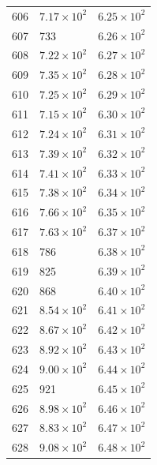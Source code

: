 \begin{table}[H]
\begin{tabular}{lll}
606 & $\displaystyle 7.17 \times 10^{2}$ & $\displaystyle 6.25 \times 10^{2}$ \\
607 & 733 & $\displaystyle 6.26 \times 10^{2}$ \\
608 & $\displaystyle 7.22 \times 10^{2}$ & $\displaystyle 6.27 \times 10^{2}$ \\
609 & $\displaystyle 7.35 \times 10^{2}$ & $\displaystyle 6.28 \times 10^{2}$ \\
610 & $\displaystyle 7.25 \times 10^{2}$ & $\displaystyle 6.29 \times 10^{2}$ \\
611 & $\displaystyle 7.15 \times 10^{2}$ & $\displaystyle 6.30 \times 10^{2}$ \\
612 & $\displaystyle 7.24 \times 10^{2}$ & $\displaystyle 6.31 \times 10^{2}$ \\
613 & $\displaystyle 7.39 \times 10^{2}$ & $\displaystyle 6.32 \times 10^{2}$ \\
614 & $\displaystyle 7.41 \times 10^{2}$ & $\displaystyle 6.33 \times 10^{2}$ \\
615 & $\displaystyle 7.38 \times 10^{2}$ & $\displaystyle 6.34 \times 10^{2}$ \\
616 & $\displaystyle 7.66 \times 10^{2}$ & $\displaystyle 6.35 \times 10^{2}$ \\
617 & $\displaystyle 7.63 \times 10^{2}$ & $\displaystyle 6.37 \times 10^{2}$ \\
618 & 786 & $\displaystyle 6.38 \times 10^{2}$ \\
619 & 825 & $\displaystyle 6.39 \times 10^{2}$ \\
620 & 868 & $\displaystyle 6.40 \times 10^{2}$ \\
621 & $\displaystyle 8.54 \times 10^{2}$ & $\displaystyle 6.41 \times 10^{2}$ \\
622 & $\displaystyle 8.67 \times 10^{2}$ & $\displaystyle 6.42 \times 10^{2}$ \\
623 & $\displaystyle 8.92 \times 10^{2}$ & $\displaystyle 6.43 \times 10^{2}$ \\
624 & $\displaystyle 9.00 \times 10^{2}$ & $\displaystyle 6.44 \times 10^{2}$ \\
625 & 921 & $\displaystyle 6.45 \times 10^{2}$ \\
626 & $\displaystyle 8.98 \times 10^{2}$ & $\displaystyle 6.46 \times 10^{2}$ \\
627 & $\displaystyle 8.83 \times 10^{2}$ & $\displaystyle 6.47 \times 10^{2}$ \\
628 & $\displaystyle 9.08 \times 10^{2}$ & $\displaystyle 6.48 \times 10^{2}$ \\

\end{tabular}
\end{table}
